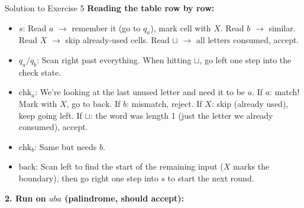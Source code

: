 \documentclass[11pt,a4paper]{article}
\newcommand{\blank}{\sqcup}
\begin{document}
\begin{solutionbox}{Solution to Exercise 5}
\textbf{Reading the table row by row:}
\begin{itemize}
    \item $s$: Read $a$ $\to$ remember it (go to $q_a$), mark cell with $X$. Read $b$ $\to$ similar. Read $X$ $\to$ skip already-used cells. Read $\blank$ $\to$ all letters consumed, accept.
    \item $q_a / q_b$: Scan right past everything. When hitting $\blank$, go left one step into the check state.
    \item $\text{chk}_a$: We're looking at the last unused letter and need it to be $a$. If $a$: match! Mark with $X$, go to $\text{back}$. If $b$: mismatch, reject. If $X$: skip (already used), keep going left. If $\blank$: the word was length 1 (just the letter we already consumed), accept.
    \item $\text{chk}_b$: Same but needs $b$.
    \item $\text{back}$: Scan left to find the start of the remaining input ($X$ marks the boundary), then go right one step into $s$ to start the next round.
\end{itemize}

\medskip
\textbf{2. Run on $aba$ (palindrome, should accept):}


\end{solutionbox}
\end{document}

